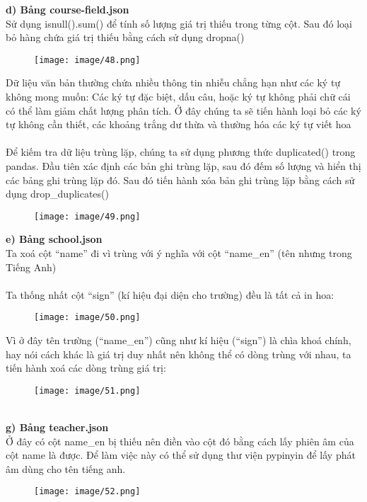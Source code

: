 \textbf{d) Bảng course-field.json}\\
Sử dụng isnull().sum() để tính số lượng giá trị thiếu trong từng cột. Sau đó loại bỏ hàng chứa giá trị thiếu bằng cách sử dụng dropna()
\newpage
\begin{figure}
    \centering
    \texttt{[image: image/48.png]}
\end{figure}
Dữ liệu văn bản thường chứa nhiều thông tin nhiễu chẳng hạn như các ký tự không mong muốn: Các ký tự đặc biệt, dấu câu, hoặc ký tự không phải chữ cái có thể làm giảm chất lượng phân tích. Ở đây chúng ta sẽ tiến hành loại bỏ các ký tự không cần thiết, các khoảng trắng dư thừa và thường hóa các ký tự viết hoa\\
\\
Để kiếm tra dữ liệu trùng lặp, chúng ta sử dụng phương thức duplicated() trong pandas. Đầu tiên xác định các bản ghi trùng lặp, sau đó đếm số lượng và hiển thị các bảng ghi trùng lặp đó. Sau đó tiến hành xóa bản ghi trùng lặp bằng cách sử dụng drop\_duplicates()
\newpage
\begin{figure}
    \centering
    \texttt{[image: image/49.png]}
\end{figure}
\textbf{e) Bảng school.json}\\
Ta xoá cột “name” đi vì trùng với ý nghĩa với cột “name\_en” (tên nhưng trong Tiếng Anh)\\
\\
Ta thống nhất cột “sign” (kí hiệu đại diện cho trường) đều là tất cả in hoa:
\newpage
\begin{figure}
    \centering
    \texttt{[image: image/50.png]}
\end{figure}
Vì ở đây tên trường (“name\_en”) cũng như kí hiệu (“sign”) là chìa khoá chính, hay nói cách khác là giá trị duy nhất nên không thể có dòng trùng với nhau, ta tiến hành xoá các dòng trùng giá trị:
\begin{figure}[h]
    \centering
    \texttt{[image: image/51.png]}
\end{figure}\\
\textbf{g) Bảng teacher.json}\\
Ở đây có cột name\_en bị thiếu nên điền vào cột đó bằng cách lấy phiên âm của cột name là được. Để làm việc này có thể sử dụng thư viện pypinyin để lấy phát âm dùng cho tên tiếng anh.
\newpage
\begin{figure}
    \centering
    \texttt{[image: image/52.png]}
\end{figure}
